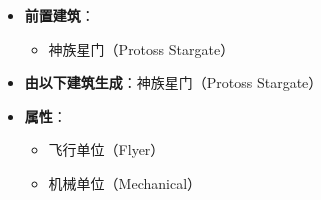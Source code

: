 \begin{tcolorbox}[colback=white, colframe=black!60!white, title=Protoss\_Scout(), arc=0mm]
\begin{itemize}
\begin{itemize}
            \end{itemize}
        \item \textbf{前置建筑}：
            \begin{itemize}
                \item 神族星门（Protoss Stargate）
            \end{itemize}
        \item \textbf{由以下建筑生成}：神族星门（Protoss Stargate）
        \item \textbf{属性}：
            \begin{itemize}
                \item 飞行单位（Flyer）
                \item 机械单位（Mechanical）
            \end{itemize}
    \end{itemize}
\end{tcolorbox}

